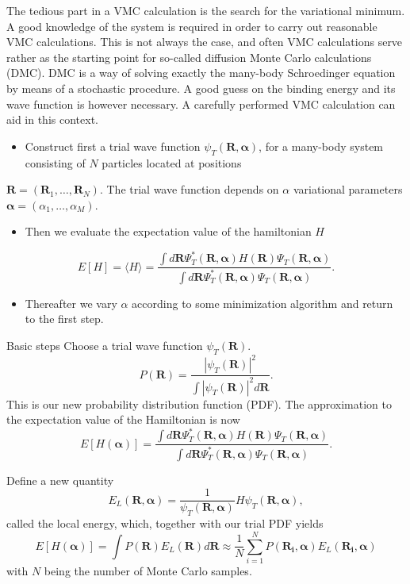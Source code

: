 \documentclass[graybox,sectrefs,envcountresetchap,open=right]{svmonodo}
\begin{document}
The tedious part in a VMC calculation is the search for the variational
minimum. A good knowledge of the system is required in order to carry out
reasonable VMC calculations. This is not always the case, 
and often VMC calculations 
serve rather as the starting
point for so-called diffusion Monte Carlo calculations (DMC). DMC is a way of
solving exactly the many-body Schroedinger equation by means of 
a stochastic procedure. A good guess on the binding energy
and its wave function is however necessary. 
A carefully performed VMC calculation can aid in this context. 




\begin{itemize}
\item Construct first a trial wave function $\psi_T(\bm{R},\bm{\alpha})$,  for a many-body system consisting of $N$ particles located at positions 
\end{itemize}

\noindent
$\bm{R}=(\bm{R}_1,\dots ,\bm{R}_N)$. The trial wave function depends on $\alpha$ variational parameters $\bm{\alpha}=(\alpha_1,\dots ,\alpha_M)$.
\begin{itemize}
\item Then we evaluate the expectation value of the hamiltonian $H$ 
\end{itemize}

\noindent
\[
   E[H]=\langle H \rangle =
   \frac{\int d\bm{R}\Psi^{\ast}_{T}(\bm{R},\bm{\alpha})H(\bm{R})\Psi_{T}(\bm{R},\bm{\alpha})}
        {\int d\bm{R}\Psi^{\ast}_{T}(\bm{R},\bm{\alpha})\Psi_{T}(\bm{R},\bm{\alpha})}.
\]
\begin{itemize}
\item Thereafter we vary $\alpha$ according to some minimization algorithm and return to the first step.
\end{itemize}

\noindent
 Basic steps
Choose a trial wave function
$\psi_T(\bm{R})$.
\[
   P(\bm{R})= \frac{\left|\psi_T(\bm{R})\right|^2}{\int \left|\psi_T(\bm{R})\right|^2d\bm{R}}.
\]
This is our new probability distribution function  (PDF).
The approximation to the expectation value of the Hamiltonian is now 
\[
   E[H(\bm{\alpha})] = 
   \frac{\int d\bm{R}\Psi^{\ast}_T(\bm{R},\bm{\alpha})H(\bm{R})\Psi_T(\bm{R},\bm{\alpha})}
        {\int d\bm{R}\Psi^{\ast}_T(\bm{R},\bm{\alpha})\Psi_T(\bm{R},\bm{\alpha})}.
\]




Define a new quantity
\[
   E_L(\bm{R},\bm{\alpha})=\frac{1}{\psi_T(\bm{R},\bm{\alpha})}H\psi_T(\bm{R},\bm{\alpha}),
   \label{eq:locale1}
\]
called the local energy, which, together with our trial PDF yields
\[
  E[H(\bm{\alpha})]=\int P(\bm{R})E_L(\bm{R}) d\bm{R}\approx \frac{1}{N}\sum_{i=1}^NP(\bm{R_i},\bm{\alpha})E_L(\bm{R_i},\bm{\alpha})
  \label{eq:vmc1}
\]
with $N$ being the number of Monte Carlo samples.
\end{document}
